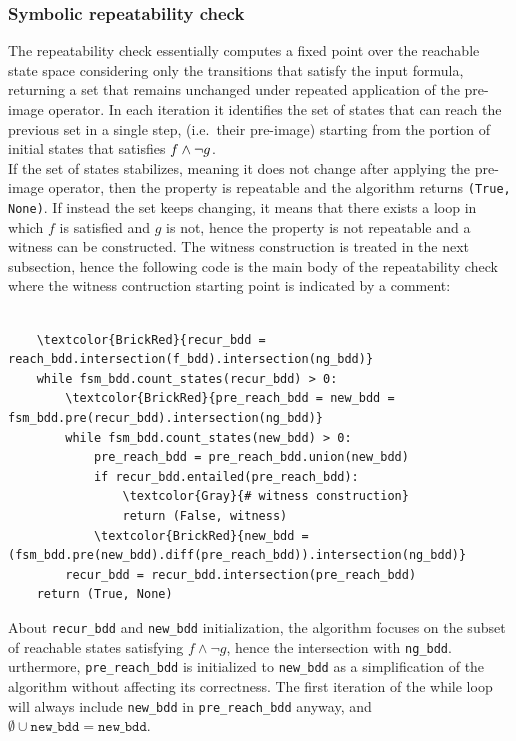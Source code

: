 \subsubsection*{Symbolic repeatability check}
The repeatability check essentially computes a fixed point over the reachable state space considering only the transitions that satisfy the input formula, returning a set that remains unchanged under repeated application of the pre-image operator. In each iteration it identifies the set of states that can reach the previous set in a single step, (i.e.\ their pre-image) starting from the portion of initial states that satisfies \(f \wedge \neg g\).\\[2ex]
If the set of states stabilizes, meaning it does not change after applying the pre-image operator, then the property is repeatable and the algorithm returns \texttt{(True, None)}. If instead the set keeps changing, it means that there exists a loop in which \(f\) is satisfied and \(g\) is not, hence the property is not repeatable and a witness can be constructed. The witness construction is treated in the next subsection, hence the following code is the main body of the repeatability check where the witness contruction starting point is indicated by a comment:
\begin{scriptsize}
\begin{Verbatim}[commandchars=\\\{\}]

    \textcolor{BrickRed}{recur_bdd = reach_bdd.intersection(f_bdd).intersection(ng_bdd)}
    while fsm_bdd.count_states(recur_bdd) > 0:
        \textcolor{BrickRed}{pre_reach_bdd = new_bdd = fsm_bdd.pre(recur_bdd).intersection(ng_bdd)}
        while fsm_bdd.count_states(new_bdd) > 0:
            pre_reach_bdd = pre_reach_bdd.union(new_bdd)
            if recur_bdd.entailed(pre_reach_bdd):
                \textcolor{Gray}{# witness construction}
                return (False, witness)
            \textcolor{BrickRed}{new_bdd = (fsm_bdd.pre(new_bdd).diff(pre_reach_bdd)).intersection(ng_bdd)}
        recur_bdd = recur_bdd.intersection(pre_reach_bdd)
    return (True, None)

\end{Verbatim}
\end{scriptsize}

About \texttt{recur\_bdd} and \texttt{new\_bdd} initialization, the algorithm focuses on the subset of reachable states satisfying \(f \land \neg g\), hence the intersection with \texttt{ng\_bdd}. urthermore, \texttt{pre\_reach\_bdd} is initialized to \texttt{new\_bdd} as a simplification of the algorithm without affecting its correctness. The first iteration of the while loop will always include \texttt{new\_bdd} in \texttt{pre\_reach\_bdd} anyway, and \(\emptyset \cup \texttt{new\_bdd} = \texttt{new\_bdd}\).
\newpage
